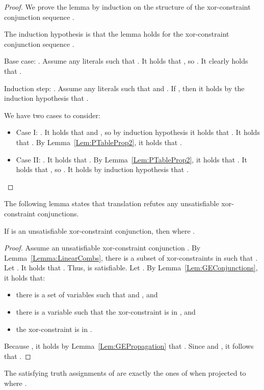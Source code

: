 \begin{proof}
We prove the lemma by induction on the structure of the xor-constraint conjunction
sequence .

The induction hypothesis is that the lemma holds for the xor-constraint conjunction
sequence .

Base case: . 
Assume any literals  such that
. 
It holds that , so . 
It clearly holds that .

Induction step: .
Assume any literals  such that  and . 
If , then it holds by the induction hypothesis that .


We have two cases to consider:
\begin{itemize}
\item Case I: . 
It holds that 
  and ,
  so by induction hypothesis it holds that . 
It holds that . 
By Lemma~\ref{Lem:PTableProp2}, it holds that .

\item Case II: . 
It holds that .
By Lemma~\ref{Lem:PTableProp2}, it holds that . 
It holds that , so .
It holds by induction hypothesis that .
\end{itemize}
\end{proof}

The following lemma states that  translation refutes any
unsatisfiable xor-constraint conjunctions.
\begin{lemma}
\label{Lem:GEUnsat}
If  is an unsatisfiable xor-constraint conjunction, then
 where
.
\end{lemma}

\begin{proof}
Assume an unsatisfiable xor-constraint conjunction .
By Lemma~\ref{Lemma:LinearCombs}, there is a subset  of xor-constraints in  
such that .
Let .  It holds that . Thus,  is satisfiable. 
Let .
By
Lemma~\ref{Lem:GEConjunctions}, it holds that:
\begin{itemize}

\item there is a set of variables  such that  and , and

\item there is a variable 
such that the xor-constraint  is in , and

\item the xor-constraint  is in .
\end{itemize}

Because , it holds 
by Lemma~\ref{Lem:GEPropagation} that .
Since  and , it follows
that .
\end{proof}

\begin{lemma} 
\label{Lem:PropTableModels}
The satisfying truth assignments of  are exactly the
ones of  when projected to  where .
\end{lemma}

